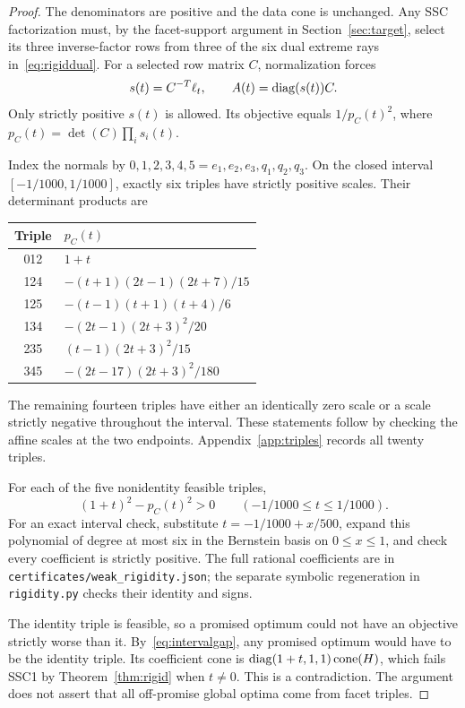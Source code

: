 \documentclass[11pt]{article}
\theoremstyle{definition}\newtheorem{definition}[theorem]{Definition}
\begin{document}
\begin{proof}
The denominators are positive and the data cone is unchanged. Any SSC factorization must, by the facet-support argument in Section~\ref{sec:target}, select its three inverse-factor rows from three of the six dual extreme rays in~\eqref{eq:rigiddual}. For a selected row matrix $C$, normalization forces
\begin{equation}
 s(t)=C^{-T}\ell_t,\qquad A(t)=\operatorname{diag}(s(t))C.
\end{equation}
Only strictly positive $s(t)$ is allowed. Its objective equals $1/p_C(t)^2$, where $p_C(t)=\det(C)\prod_i s_i(t)$.

Index the normals by $0,1,2,3,4,5=e_1,e_2,e_3,q_1,q_2,q_3$. On the closed interval $[-1/1000,1/1000]$, exactly six triples have strictly positive scales. Their determinant products are
\begin{center}
\begin{tabular}{cl}
\toprule
Triple & $p_C(t)$\\
\midrule
012 & $1+t$\\
124 & $-(t+1)(2t-1)(2t+7)/15$\\
125 & $-(t-1)(t+1)(t+4)/6$\\
134 & $-(2t-1)(2t+3)^2/20$\\
235 & $(t-1)(2t+3)^2/15$\\
345 & $-(2t-17)(2t+3)^2/180$\\
\bottomrule
\end{tabular}
\end{center}
The remaining fourteen triples have either an identically zero scale or a scale strictly negative throughout the interval. These statements follow by checking the affine scales at the two endpoints. Appendix~\ref{app:triples} records all twenty triples.

For each of the five nonidentity feasible triples,
\begin{equation}
 (1+t)^2-p_C(t)^2>0\qquad (-1/1000\le t\le1/1000).
 \label{eq:intervalgap}
\end{equation}
For an exact interval check, substitute $t=-1/1000+x/500$, expand this polynomial of degree at most six in the Bernstein basis on $0\le x\le1$, and check every coefficient is strictly positive. The full rational coefficients are in \texttt{certificates/weak\_rigidity.json}; the separate symbolic regeneration in \texttt{rigidity.py} checks their identity and signs.

The identity triple is feasible, so a promised optimum could not have an objective strictly worse than it. By~\eqref{eq:intervalgap}, any promised optimum would have to be the identity triple. Its coefficient cone is $\operatorname{diag}(1+t,1,1)\operatorname{cone}(H)$, which fails SSC1 by Theorem~\ref{thm:rigid} when $t\ne0$. This is a contradiction. The argument does not assert that all off-promise global optima come from facet triples.
\end{proof}
\end{document}
